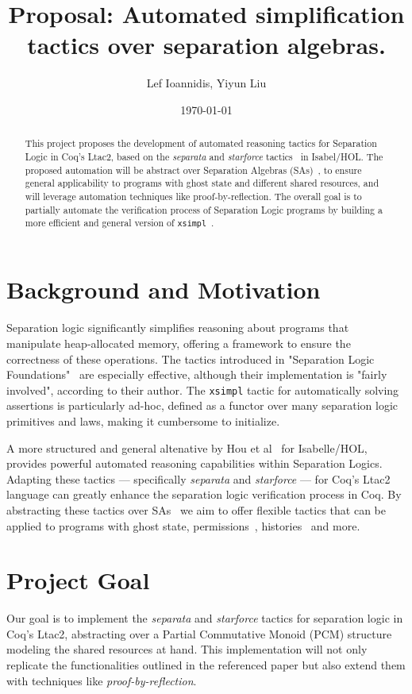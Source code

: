 \documentclass[12pt,lettersize]{article}
\title{Proposal: Automated simplification tactics over separation algebras.}
\author{Lef Ioannidis, Yiyun Liu}
\date{\today}
\begin{document}
\maketitle


\begin{abstract}
This project proposes the development of automated reasoning tactics for Separation Logic in Coq's Ltac2, based on the \emph{separata}
and \emph{starforce} tactics~\cite{hou2017proof} in Isabel/HOL. The proposed automation will be
abstract over Separation Algebras (SAs)~\cite{calcagno2007local}, to ensure general applicability to programs with 
ghost state and different shared resources, and will leverage automation techniques like proof-by-reflection.
The overall goal is to partially automate the verification process of Separation Logic programs by building
a more efficient and general version of \texttt{xsimpl}~\cite{chargueraud2020separation}.
\end{abstract}

\section{Background and Motivation}
Separation logic significantly simplifies reasoning about programs that manipulate heap-allocated memory, offering a framework
to ensure the correctness of these operations. The tactics introduced in "Separation Logic Foundations"~\cite{chargueraud2020separation}
are especially effective, although their implementation is "fairly involved", according to their author. The \texttt{xsimpl} tactic
for automatically solving assertions is particularly ad-hoc, defined as a functor over many separation logic primitives and laws,
making it cumbersome to initialize.

A more structured and general altenative by Hou et al~\cite{hou2017proof} for Isabelle/HOL, provides powerful automated reasoning
capabilities within Separation Logics. Adapting these tactics --- specifically \emph{separata} and 
\emph{starforce} --- for Coq's Ltac2 language can greatly enhance the separation logic verification process in Coq.
By abstracting these tactics over SAs~\cite{calcagno2007local} we aim to offer
flexible tactics that can be applied to programs with ghost state, permissions~\cite{bornat2005permission}, 
histories~\cite{sergey2015specifying} and more.

\section{Project Goal}
Our goal is to implement the \emph{separata} and \emph{starforce} tactics for separation logic in Coq's Ltac2, abstracting over
a Partial Commutative Monoid (PCM) structure modeling the shared resources at hand. This implementation will not only replicate
the functionalities outlined in the referenced paper but also extend them with techniques
like \emph{proof-by-reflection}.
\end{document}
